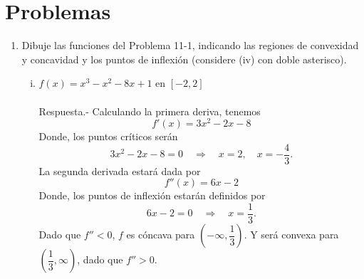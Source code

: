 \section{Problemas}

\begin{enumerate}[\bfseries 1.]

    \item Dibuje las funciones del Problema 11-1, indicando las regiones de convexidad y concavidad y los puntos de inflexión (considere (iv) con doble asterisco).\\
	\begin{enumerate}[(i)]

	    \item $f(x)=x^3-x^2-8x+1$ en $[-2,2]$\\\\
		Respuesta.-\; Calculando la primera deriva, tenemos
		$$f'(x)=3x^2-2x-8$$
		Donde, los puntos críticos serán
		$$3x^2-2x-8=0\quad \Rightarrow \quad x=2,\quad x=-\dfrac{4}{3}.$$
		La segunda derivada estará dada por
		$$f''(x)=6x-2$$
		Donde, los puntos de inflexión estarán definidos por
		$$6x-2=0\quad \Rightarrow \quad x=\dfrac{1}{3}.$$
		Dado que $f''<0$, $f$ es cóncava para $\left(-\infty,\dfrac{1}{3}\right)$. Y será convexa para $\left(\dfrac{1}{3},\infty\right)$, dado que $f''>0$.\\
		\begin{center}
		\end{center}
		\vspace{.5cm}


\end{enumerate}
\end{enumerate}
